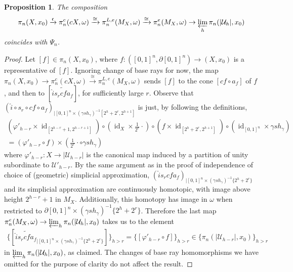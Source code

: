 \documentclass[a4paper,11pt]{article}
\theoremstyle{definition}
\theoremstyle{plain}
\newtheorem{prop}[definition]{Proposition}
\theoremstyle{remark}
\DeclareMathOperator{\id}{id}
\begin{document}
{\begin{prop} \label{samepsi} The composition
\begin{align*}
\pi_{n}(X,x_0)\xrightarrow {\mathfrak{c}}\pi_{n}^{c}(cX,\omega)\xrightarrow{\cong} \pi_{n}^{L,e}(M_{X},\omega)\xrightarrow{\cong} \pi_{n}^{e}(M_{X},\omega) \rightarrow \varprojlim_{h} \pi_{n} (|\mathcal{U}_{h}|,x_0)
\end{align*}
coincides with $\Psi_{n}$. 
\end{prop}
\begin{proof} Let $[f] \in \pi_{n}(X,x_0)$, where $f:([0,1]^n,\partial [0,1]^n)\rightarrow (X,x_0)$ is a representative of $[f]$. Ignoring change of base rays for now, the map $\pi_{n}(X,x_0)\rightarrow \pi_{n}^c(cX,\omega) \xrightarrow{\cong} \pi_{n}^{L,e}(M_{X},\omega)$ sends $[f]$ to the cone $[cf \circ a_{f}]$ of $f$, and then to $[\widetilde{\hat{i} s_{r} cf a_{f}}]$, for sufficiently large $r$. Observe that $(\hat{i} \circ s_{r} \circ cf \circ a_{f})_{|[0,1]^n \times (\gamma sh_{\gamma})^{-1}[2^{h}+2^r,2^{h+1}]}$ is just, by following the definitions,  
\begin{align*}
(\varphi'_{h-r} \times \id _{[2^{h-r} +1, 2^{h-r+1}]})\circ (\id_{X} \times \frac{1}{2^r} \cdot)\circ (f\times \id_{[2^h+2^r,2^{h+1}]}) \circ (\id_{[0,1]^n} \times \gamma sh_{\gamma})\\
= (\varphi'_{h-r}\circ f) \times (\frac{1}{2^r} \cdot \circ \gamma sh_{\gamma})
\end{align*} where $\varphi'_{h-r}: X\rightarrow |\mathcal{U}_{h-r}| $ is the canonical map induced by a partition of unity subordinate to $\mathcal{U}'_{h-r}$. By the same argument as in the proof of independence of choice of (geometric) simplicial approximation, $(\hat{i}  s_{r}  cf  a_{f})_{|[0,1]^n \times (\gamma sh_{\gamma})^{-1}\{2^{h}+2^r\}}$ and its simplicial approximation are continuously homotopic, with image above height $2^{h-r}+1$ in $M_{X}$. Additionally, this homotopy has image in $\omega$ when restricted to $\partial [0,1]^n \times (\gamma sh_{\gamma})^{-1}\{2^{h}+2^r\}$. Therefore the last map $\pi_{n}^{e}(M_{X},\omega) \rightarrow \varprojlim_{h} \pi_{n} (|\mathcal{U}_{h}|,x_0)$ takes us to the element 
\begin{align*}
\{[ \widetilde{\hat{i} s_{r} cf a_{f}}_{|[0,1]^n \times (\gamma sh_{\gamma})^{-1}\{2^h+2^r\}}]\}_{h> r} = \{[ \varphi'_{h-r}\circ f ] \}_{h> r} \in \{ \pi_{n}(|\mathcal{U}_{h-r}|,x_0)\}_{h> r}
\end{align*}
in $ \varprojlim_{h}\pi_{n}(|\mathcal{U}_{h}|,x_0)$, as claimed.  The changes of base ray homomorphisms we have omitted for the purpose of clarity do not affect the result.
\end{proof}



}
\end{document}

